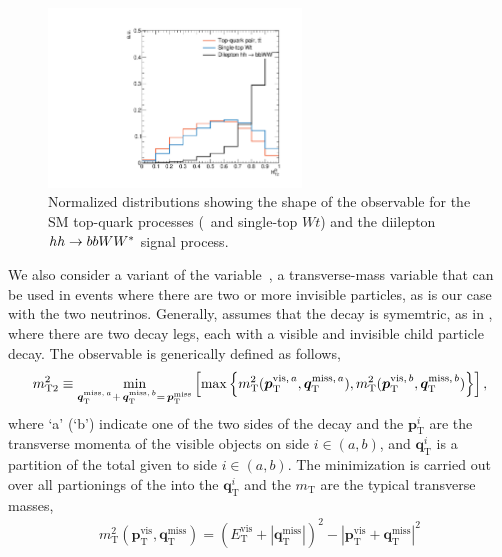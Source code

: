 \begin{figure}[!htb]
    \begin{center}
        \includegraphics[width=0.6\textwidth]{figures/search_hh/signal_pheno/shape_plots/hh_shape_plot_HT2Ratio}
        \caption{
            Normalized distributions showing the shape of the \htratio observable for the SM
            top-quark processes (\ttbar~and single-top $Wt$) and the diilepton $hh \rightarrow bbWW^*$ signal process.
        }
        \label{fig:hh_shape_htratio}
    \end{center}
\end{figure}

We also consider a variant of the \mttwo variable~\cite{MT2-Glamour,Lester2011,MT2-Tovey-Masses,Lester2014yga},
a transverse-mass variable that can be used in events where there are two or more invisible particles,
as is our case with the two neutrinos.
Generally, \mttwo assumes that the decay is symemtric, as in \ttbar, where there are two decay legs, each with
a visible and invisible child particle decay.
The \mttwo observable is generically defined as follows,
\begin{align}
    m_{\text{T2}}^2 \equiv \min\limits_{ \bm{q}_{\text{T}}^{\text{miss},\,a} + \, \bm{q}_{\text{T}}^{\text{miss},\,b} = \,\bm{p}_{\text{T}}^{\text{miss}}}
        \left[
            \max
                \left\{
                    m_{\text{T}}^2 ( \bm{p}_{\text{T}}^{\text{vis},\, a}, \bm{q}_{\text{T}}^{\text{miss},\,a} ), m_{\text{T}}^2 (\bm{p}_{\text{T}}^{\text{vis},\, b}, \bm{q}_{\text{T}}^{\text{miss},\,b} )
                \right\}
        \right],
    \label{eq:mttwo_def}
\end{align}
where `a' (`b') indicate one of the two sides of the decay and the $\bm{p}_{\text{T}}^i$ are the transverse momenta
of the visible objects on side $i \in (a,b)$, and $\bm{q}_{\text{T}}^i$ is a partition of the total \ptmiss given to side $i \in (a,b)$.
The minimization is carried out over all partionings of the \ptmiss into the $\bm{q}_{\text{T}}^i$ and the $m_{\text{T}}$ are the typical
transverse masses,
\begin{align}
    m_{\text{T}}^2 (\bm{p}_{\text{T}}^{\text{vis}}, \bm{q}_{\text{T}}^{\text{miss}} ) = ( E_{\text{T}}^{\text{vis}} + | \bm{q}_{\text{T}}^{\text{miss}} |)^2
            - |\bm{p}_{\text{T}}^{\text{vis}} + \bm{q}_{\text{T}}^{\text{miss}} |^2
    \label{eq:mt_def}
\end{align}

